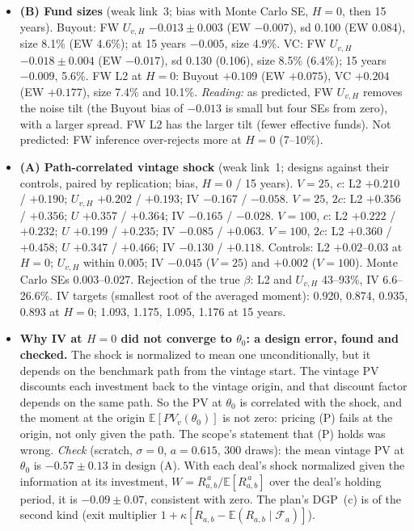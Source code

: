 \documentclass[11pt]{article}
\newcommand{\E}{\mathbb{E}}
\newcommand{\F}{\mathcal{F}}
\begin{document}
\begin{itemize}
\item \textbf{(B) Fund sizes} (weak link~3; bias with Monte Carlo SE, $H=0$, then 15 years). Buyout: FW $U_{v,H}$ $-0.013\pm0.003$ (EW $-0.007$), sd 0.100 (EW 0.084), size 8.1\% (EW 4.6\%); at 15 years $-0.005$, size 4.9\%. VC: FW $U_{v,H}$ $-0.018\pm0.004$ (EW $-0.017$), sd 0.130 (0.106), size 8.5\% (6.4\%); 15 years $-0.009$, 5.6\%. FW L2 at $H=0$: Buyout $+0.109$ (EW $+0.075$), VC $+0.204$ (EW $+0.177$), size 7.4\% and 10.1\%. \emph{Reading:} as predicted, FW $U_{v,H}$ removes the noise tilt (the Buyout bias of $-0.013$ is small but four SEs from zero), with a larger spread. FW L2 has the larger tilt (fewer effective funds). Not predicted: FW inference over-rejects more at $H=0$ (7--10\%).
\item \textbf{(A) Path-correlated vintage shock} (weak link~1; designs against their controls, paired by replication; bias, $H=0$ / 15 years). $V=25$, $c$: L2 $+0.210$ / $+0.190$; $U_{v,H}$ $+0.202$ / $+0.193$; IV $-0.167$ / $-0.058$. $V=25$, $2c$: L2 $+0.356$ / $+0.356$; $U$ $+0.357$ / $+0.364$; IV $-0.165$ / $-0.028$. $V=100$, $c$: L2 $+0.222$ / $+0.232$; $U$ $+0.199$ / $+0.235$; IV $-0.085$ / $+0.063$. $V=100$, $2c$: L2 $+0.360$ / $+0.458$; $U$ $+0.347$ / $+0.466$; IV $-0.130$ / $+0.118$. Controls: L2 $+0.02$--0.03 at $H=0$; $U_{v,H}$ within 0.005; IV $-0.045$ ($V=25$) and $+0.002$ ($V=100$). Monte Carlo SEs 0.003--0.027. Rejection of the true $\beta$: L2 and $U_{v,H}$ 43--93\%, IV 6.6--26.6\%. IV targets (smallest root of the averaged moment): 0.920, 0.874, 0.935, 0.893 at $H=0$; 1.093, 1.175, 1.095, 1.176 at 15 years.
\item \textbf{Why IV at $H=0$ did not converge to $\theta_0$: a design error, found and checked.} The shock is normalized to mean one unconditionally, but it depends on the benchmark path from the vintage start. The vintage PV discounts each investment back to the vintage origin, and that discount factor depends on the same path. So the PV at $\theta_0$ is correlated with the shock, and the moment at the origin $\E[PV_v(\theta_0)]$ is not zero: pricing (P) fails at the origin, not only given the path. The scope's statement that (P) holds was wrong. \emph{Check} (scratch, $\sigma=0$, $a=0.615$, 300 draws): the mean vintage PV at $\theta_0$ is $-0.57\pm0.13$ in design (A). With each deal's shock normalized given the information at its investment, $W=R_{a,b}^{\,a}/\E[R_{a,b}^{\,a}]$ over the deal's holding period, it is $-0.09\pm0.07$, consistent with zero. The plan's DGP~(c) is of the second kind (exit multiplier $1+\kappa[R_{a,b}-\E(R_{a,b}\mid\F_a)]$).

\end{itemize}
\end{document}
